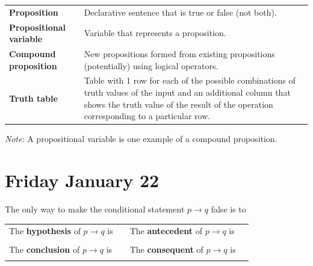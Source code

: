 \documentclass[12pt, oneside]{article}
\begin{document}
\begin{tabular}{lp{5in}}
{\bf Proposition} & Declarative sentence that is true or false (not both).\\
{\bf Propositional variable} & Variable that represents a proposition.\\
{\bf Compound proposition}& New propositions formed from existing propositions (potentially) using logical operators.\\
{\bf Truth table}& Table with 1 row for each of the possible combinations of truth values of the input and 
an additional column that shows the truth value of the result of the operation corresponding to a particular row.
\end{tabular}

{\it Note}: A propositional variable is one example of a compound proposition.











\newpage
\section*{Friday January 22}

The only way to make  the conditional statement $p \to q$ false is to \underline{\phantom{\hspace{3in}}}


\begin{tabular}{llll}
The {\bf  hypothesis}  of $p \to q$ is  &\underline{\phantom{\hspace{1in}}} &
The {\bf  antecedent}  of $p \to q$ is  &\underline{\phantom{\hspace{1in}}} \\
&&&  \\
The {\bf  conclusion}  of $p \to q$ is & \underline{\phantom{\hspace{1in}}}&
The {\bf  consequent}  of $p \to q$ is & \underline{\phantom{\hspace{1in}}}\\
&&&  \\
\end{tabular}
\end{document}
